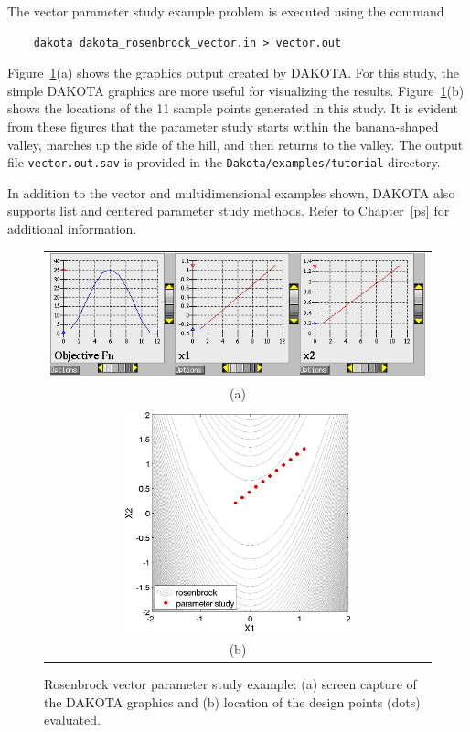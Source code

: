 The vector parameter study example problem is executed using the command
\begin{small}
\begin{verbatim}
    dakota dakota_rosenbrock_vector.in > vector.out
\end{verbatim}
\end{small}

Figure~\ref{tutorial:rosenbrock_vector_graphics}(a) shows the
graphics output created by DAKOTA.  For this study, the simple DAKOTA
graphics are more useful for visualizing the
results. Figure~\ref{tutorial:rosenbrock_vector_graphics}(b)
shows the locations of the 11 sample points generated in this study.
It is evident from these figures that the parameter study starts
within the banana-shaped valley, marches up the side of the hill, and
then returns to the valley. The output file \texttt{vector.out.sav} is
provided in the \texttt{Dakota/examples/tutorial} directory.

In addition to the vector and multidimensional examples shown, DAKOTA
also supports list and centered parameter study methods. Refer to
Chapter~\ref{ps} for additional information.

\begin{figure}[htp!]
  \centering
  \begin{tabular}{c}
  \includegraphics[width=\textwidth]{images/dak_graphics_vector}\\
  (a)\\
  \qquad\\
  \includegraphics[height=2.5in]{images/rosen_vect_pts} \\
  (b)
  \end{tabular}
  \caption{Rosenbrock vector parameter study example: (a) screen
    capture of the DAKOTA graphics and (b) location of the design
    points (dots) evaluated.}
  \label{tutorial:rosenbrock_vector_graphics}
\end{figure}

